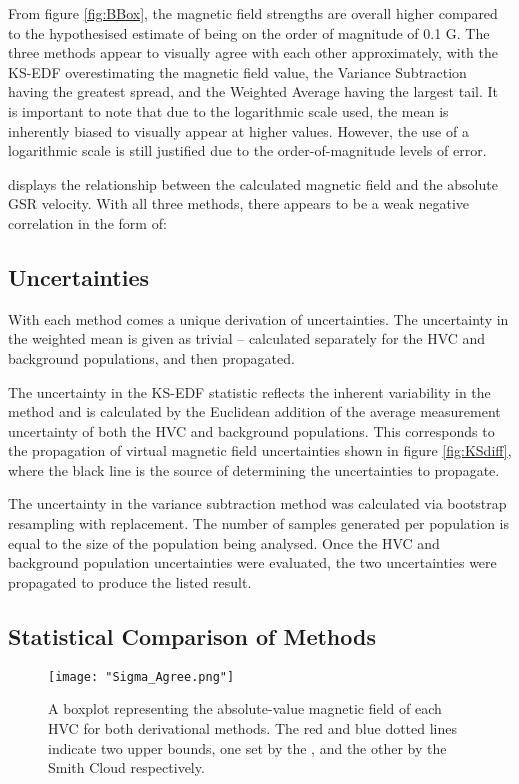 From figure \ref{fig:BBox}, the magnetic field strengths are overall higher compared to the hypothesised estimate of being on the order of magnitude of 0.1 {\textmu}G. The three methods appear to visually agree with each other approximately, with the KS-EDF overestimating the magnetic field value, the Variance Subtraction having the greatest spread, and the Weighted Average having the largest tail. It is important to note that due to the logarithmic scale used, the mean is inherently biased to visually appear at higher values. However, the use of a logarithmic scale is still justified due to the order-of-magnitude levels of error.


 displays the relationship between the calculated magnetic field and the absolute GSR velocity. With all three methods, there appears to be a weak negative correlation in the form of:

\subsection{Uncertainties}
\label{ssec:results_uncertainties}

With each method comes a unique derivation of uncertainties. The uncertainty in the weighted mean is given as trivial – calculated separately for the HVC and background populations, and then propagated.


The uncertainty in the KS-EDF statistic reflects the inherent variability in the method and is calculated by the Euclidean addition of the average measurement uncertainty of both the HVC and background populations. This corresponds to the propagation of virtual magnetic field uncertainties shown in figure \ref{fig:KSdiff}, where the black line is the source of determining the uncertainties to propagate.


The uncertainty in the variance subtraction method was calculated via bootstrap resampling with replacement. The number of samples generated per population is equal to the size of the population being analysed. Once the HVC and background population uncertainties were evaluated, the two uncertainties were propagated to produce the listed result.

\subsection{Statistical Comparison of Methods}
\label{ssec:results_stats}

\begin{figure}
    \texttt{[image: "Sigma\_Agree.png"]}
    \centering
    \caption{A boxplot representing the absolute-value magnetic field of each HVC for both derivational methods. The red and blue dotted lines indicate two upper bounds, one set by the \citeauthor[][simulations]{ID23}, and the other by the Smith Cloud respectively.}
    \label{fig:sigma_agree}
\end{figure}

